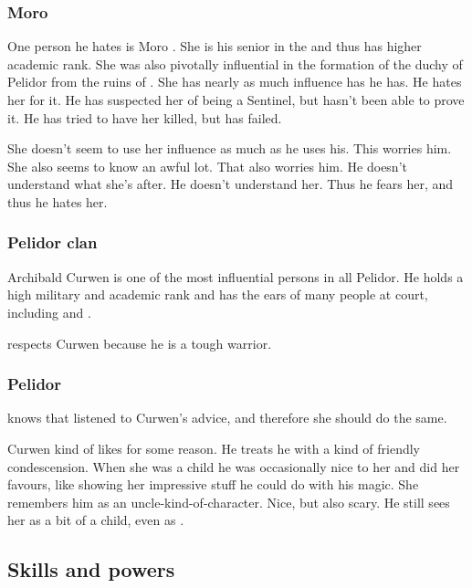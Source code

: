 \subsubsection{Moro \Cornel}
One person he hates is Moro \Cornel. 
She is his senior in the \ishrah{} and thus has higher academic rank. 
She was also pivotally influential in the formation of the duchy of Pelidor from the ruins of . 
She has nearly as much influence has he has. 
He hates her for it. 
He has suspected her of being a Sentinel, but hasn't been able to prove it. 
He has tried to have her killed, but has failed. 

She doesn't seem to use her influence as much as he uses his. 
This worries him. 
She also seems to know an awful lot. 
That also worries him. 
He doesn't understand what she's after. 
He doesn't understand her. 
Thus he fears her, and thus he hates her. 





\subsubsection{Pelidor clan}
Archibald Curwen is one of the most influential persons in all Pelidor. 
He holds a high military and academic rank and has the ears of many people at court, including \Icor{} and \Sethgal. 

\Sethgal{} respects Curwen because he is a tough warrior. 





\subsubsection{\Tiroco Pelidor}
\Tiroco{} knows that \Icor{} listened to Curwen's advice, and therefore she should do the same. 

Curwen kind of likes \Tiroco for some reason. 
He treats he with a kind of friendly condescension.
When she was a child he was occasionally nice to her and did her favours, like showing her impressive stuff he could do with his magic. 
She remembers him as an uncle-kind-of-character.
Nice, but also scary.
He still sees her as a bit of a child, even as \rinyuth.









\subsection{Skills and powers}





